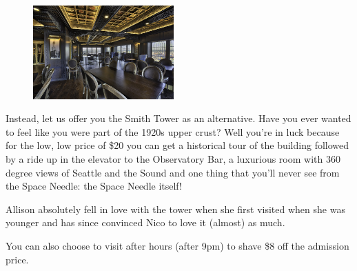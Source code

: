 \documentclass[10pt]{article}
\begin{document}
\begin{figure}
    \centering
    \includegraphics[width=0.48\textwidth]{smith.jpg}
\end{figure}

Instead, let us offer you the Smith Tower as an alternative. Have you ever wanted to feel like you 
were part of the 1920s upper crust? Well you're in luck because for the low, low price of \$20 you 
can get a historical tour of the building followed by a ride up in the elevator to the Observatory Bar,
a luxurious room with 360 degree views of Seattle and the Sound and one thing that you'll 
never see from the Space Needle: the Space Needle itself!

Allison absolutely fell in love with the tower when she first visited when she was younger
and has since convinced Nico to love it (almost) as much.

You can also choose to visit after hours (after 9pm) to shave \$8 off the admission price.
\end{document}
